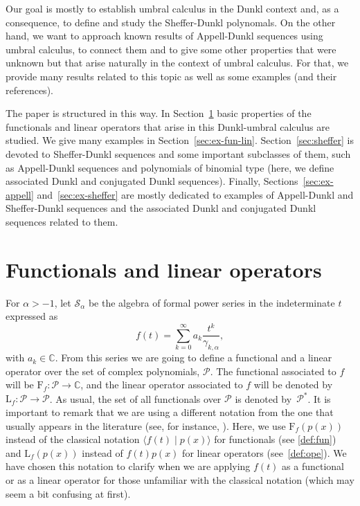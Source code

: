 \documentclass[11pt]{article}
\theoremstyle{plain}
\theoremstyle{remark}
\numberwithin{equation}{section} %
\newcommand{\calP}{\mathcal{P}}
\newcommand{\Sa}{\mathcal{S}_{\alpha}}
\newcommand{\CC}{\mathbb{C}}
\newcommand{\FF}{\mathrm{F}}
\newcommand{\LL}{\mathrm{L}}
\begin{document}
Our goal is mostly to establish umbral calculus in the Dunkl context and, as a consequence, to define and study the Sheffer-Dunkl polynomals. On the other hand, we want to approach known results of Appell-Dunkl sequences using umbral calculus, to connect them and to give some other properties that were unknown but that arise naturally in the context of umbral calculus. For that, we provide many results related to this topic as well as some examples (and their references).



The paper is structured in this way. In Section~\ref{sec:fun-lin-op} basic properties of the functionals and linear operators that arise in this Dunkl-umbral calculus are studied. We give many examples in Section~\ref{sec:ex-fun-lin}. Section~\ref{sec:sheffer} is devoted to Sheffer-Dunkl sequences and some important subclasses of them, such as Appell-Dunkl sequences and polynomials of binomial type (here, we define associated Dunkl and conjugated Dunkl sequences). Finally, Sections~\ref{sec:ex-appell} and~\ref{sec:ex-sheffer} are mostly dedicated to examples of Appell-Dunkl and Sheffer-Dunkl sequences and the associated Dunkl and conjugated Dunkl sequences related to them.

\section{Functionals and linear operators}
\label{sec:fun-lin-op}

For $\alpha>-1$, let $\Sa$ be the algebra of formal power series in the indeterminate $t$ expressed as
\begin{equation}
\label{eq:series}
f(t) = \sum_{k=0}^{\infty} a_k \frac{t^k}{\gamma_{k,\alpha}},
\end{equation}
with $a_k \in \CC$. From this series we are going to define a functional and a linear operator over the set of complex polynomials, $\calP$. The functional associated to $f$ will be $\FF_f : \calP \to \CC$, and the linear operator associated to $f$ will be denoted by $\LL_f : \calP \to \calP$.
As usual, the set of all functionals over $\calP$ is denoted by~$\calP^*$. It is important to remark that we are using a different notation from the one that usually appears in the literature (see, for instance, \cite{Rom}). Here, we use $\FF_f(p(x))$ instead of the classical notation $\langle f(t) \mid p(x)\rangle$ for functionals (see \eqref{def:fun}) and $\LL_f(p(x))$ instead of $f(t)p(x)$ for linear operators (see~\eqref{def:ope}). We have chosen this notation to clarify when we are applying $f(t)$ as a functional or as a linear operator for those unfamiliar with the classical notation (which may seem a bit confusing at first).
\end{document}
